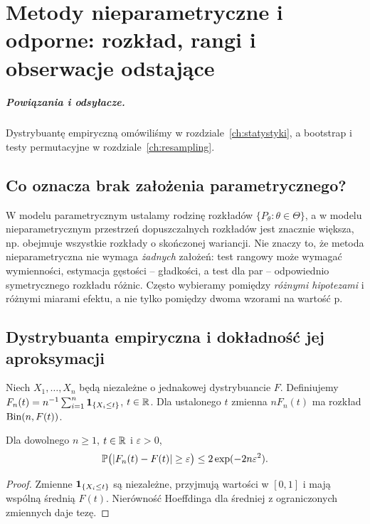 \chapter{Metody nieparametryczne i odporne: rozkład, rangi i obserwacje odstające}
\label{ch:nonparametric}
\paragraph{Powiązania i odsyłacze.} Dystrybuantę empiryczną omówiliśmy w rozdziale~\ref{ch:statystyki}, a bootstrap i testy permutacyjne w rozdziale~\ref{ch:resampling}.


\section{Co oznacza brak założenia parametrycznego?}
W modelu parametrycznym ustalamy rodzinę rozkładów
$\{P_\theta:\theta\in\Theta\}$, a w modelu nieparametrycznym
przestrzeń dopuszczalnych rozkładów jest znacznie większa,
np. obejmuje wszystkie rozkłady o skończonej wariancji.
Nie znaczy to, że metoda nieparametryczna nie wymaga
\emph{żadnych} założeń: test rangowy może wymagać wymienności,
estymacja gęstości -- gładkości, a test dla par -- odpowiednio
symetrycznego rozkładu różnic. Często wybieramy pomiędzy
\emph{różnymi hipotezami} i różnymi miarami efektu,
a nie tylko pomiędzy dwoma wzorami na wartość p.

\section{Dystrybuanta empiryczna i dokładność jej aproksymacji}
\begin{definicja}
Niech $X_1,\ldots,X_n$ będą niezależne o jednakowej
dystrybuancie $F$. Definiujemy
$F_n(t)=n^{-1}\sum_{i=1}^n\mathbf 1_{\{X_i\le t\}}$,
$t\in\mathbb R$. Dla ustalonego $t$ zmienna $nF_n(t)$
ma rozkład $\operatorname{Bin}(n,F(t))$.
\end{definicja}

\begin{twierdzenie}
\label{thm:empirical-hoeffding}
Dla dowolnego $n\ge1$, $t\in\mathbb R$ i $\varepsilon>0$,
\[
 \mathbb P\bigl(|F_n(t)-F(t)|\ge\varepsilon\bigr)
 \le2\exp(-2n\varepsilon^2).
\]
\end{twierdzenie}
\begin{proof}
Zmienne $\mathbf 1_{\{X_i\le t\}}$ są niezależne, przyjmują
wartości w $[0,1]$ i mają wspólną średnią $F(t)$.
Nierówność Hoeffdinga dla średniej z ograniczonych
zmiennych daje tezę.
\end{proof}

